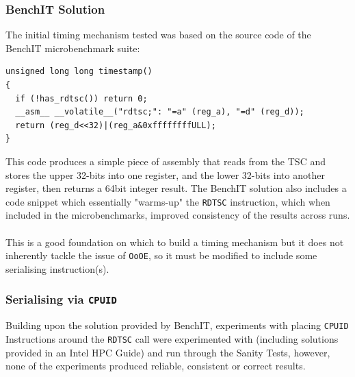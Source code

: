 \documentclass[bsc,frontabs,twoside,singlespacing,parskip,deptreport]{infthesis}     %
\begin{document}
\subsubsection{BenchIT Solution\cite{benchit_src}}\label{benchit-disc}
The initial timing mechanism tested was based on the source code of the BenchIT microbenchmark suite:
\begin{verbatim}
unsigned long long timestamp()
{
  if (!has_rdtsc()) return 0;
  __asm__ __volatile__("rdtsc;": "=a" (reg_a), "=d" (reg_d));
  return (reg_d<<32)|(reg_a&0xffffffffULL);
}
\end{verbatim}
This code produces a simple piece of assembly that reads from the TSC and stores the upper 32-bits into one register, and the lower 32-bits into another register, then returns a 64bit integer result. The BenchIT solution also includes a code snippet which essentially "warms-up" the \texttt{RDTSC} instruction, which when included in the microbenchmarks, improved consistency of the results across runs.\\
\\
This is a good foundation on which to build a timing mechanism but it does not inherently tackle the issue of \texttt{OoOE}, so it must be modified to include some serialising instruction(s).

\subsubsection{Serialising via \texttt{CPUID}}
Building upon the solution provided by BenchIT, experiments with placing \texttt{CPUID} Instructions around the \texttt{RDTSC} call were experimented with (including solutions provided in an Intel HPC Guide\cite{intel_hpc_guide}) and run through the Sanity Tests, however, none of the experiments produced reliable, consistent or correct results.
\end{document}
